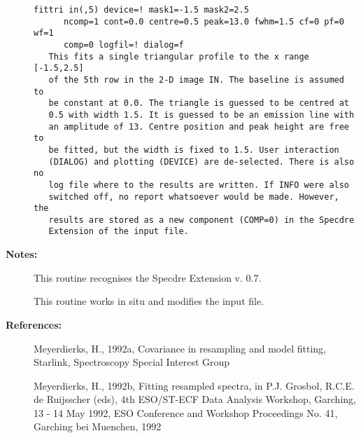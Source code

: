 \begin{description}
\begin{verbatim}
fittri in(,5) device=! mask1=-1.5 mask2=2.5
      ncomp=1 cont=0.0 centre=0.5 peak=13.0 fwhm=1.5 cf=0 pf=0 wf=1
      comp=0 logfil=! dialog=f
   This fits a single triangular profile to the x range [-1.5,2.5]
   of the 5th row in the 2-D image IN. The baseline is assumed to
   be constant at 0.0. The triangle is guessed to be centred at
   0.5 with width 1.5. It is guessed to be an emission line with
   an amplitude of 13. Centre position and peak height are free to
   be fitted, but the width is fixed to 1.5. User interaction
   (DIALOG) and plotting (DEVICE) are de-selected. There is also no
   log file where to the results are written. If INFO were also
   switched off, no report whatsoever would be made. However, the
   results are stored as a new component (COMP=0) in the Specdre
   Extension of the input file.
\end{verbatim}

\item [{\bf Notes:}]
This routine recognises the Specdre Extension v. 0.7.

This routine works in situ and modifies the input file.

\item [{\bf References:}]
   Meyerdierks, H., 1992a, Covariance in resampling and model fitting,
   Starlink, Spectroscopy Special Interest Group

   Meyerdierks, H., 1992b, Fitting resampled spectra, in P.J.
   Grosbol, R.C.E. de Ruijsscher (eds), 4th ESO/ST-ECF Data Analysis
   Workshop, Garching, 13 - 14 May 1992, ESO Conference and Workshop
   Proceedings No. 41, Garching bei Muenchen, 1992
\end{description}
